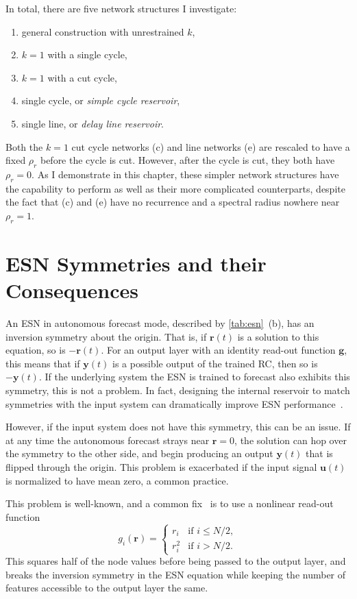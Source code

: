 In total, there are five network structures I investigate:
\begin{enumerate}[label= (\alph*)]
\item general construction with unrestrained $k$,
\item $k = 1$ with a single cycle,
\item $k = 1$ with a cut cycle,
\item single cycle, or \emph{simple cycle reservoir},
\item single line, or \emph{delay line reservoir}.
\end{enumerate}
Both the $k = 1$ cut cycle networks (c) and line networks (e) are
rescaled to have a fixed $\rho_r$ before the cycle is cut. However,
after the cycle is cut, they both have $\rho_r=0$. As I
demonstrate in this chapter, these simpler network structures have the capability to
perform as well as their more complicated counterparts, despite the
fact that (c) and (e) have no recurrence and a spectral radius nowhere
near $\rho_r = 1$.

\section{ESN Symmetries and their Consequences}\label{sec:lowk-symmetries}

An ESN in autonomous forecast mode, described by \cref{tab:esn}~(b),
has an inversion symmetry about the origin. That is, if $\bm{r}(t)$ is
a solution to this equation, so is $-\bm{r}(t)$. For an output layer
with an identity read-out function $\bm{g}$, this means that if
$\bm{y}(t)$ is a possible output of the trained RC, then so is
$-\bm{y}(t)$. If the underlying system the ESN is trained to forecast
also exhibits this symmetry, this is not a problem. In fact, designing
the internal reservoir to match symmetries with the input system can
dramatically improve ESN performance~\cite{barbosa2021}.

However, if the input system does not have this symmetry, this can be
an issue. If at any time the autonomous forecast strays near $\bm{r} =
0$, the solution can hop over the symmetry to the other side, and
begin producing an output $\bm{y}(t)$ that is flipped through the
origin. This problem is exacerbated if the input signal $\bm{u}(t)$ is
normalized to have mean zero, a common practice.

This problem is well-known, and a common fix~\cite{pathak2017,herteux2020}
is to use a nonlinear read-out function
\begin{equation}
  g_i(\bm{r}) = \begin{cases}
    r_i & \text{if } i \leq N / 2, \\
    r_i^2 & \text{if } i > N / 2.
  \end{cases}
  \label{eq:esn-break-sym}
\end{equation}
This squares half of the node values before being passed
to the output layer, and breaks the inversion symmetry in the ESN
equation while keeping the number of features accessible to the output
layer the same.

